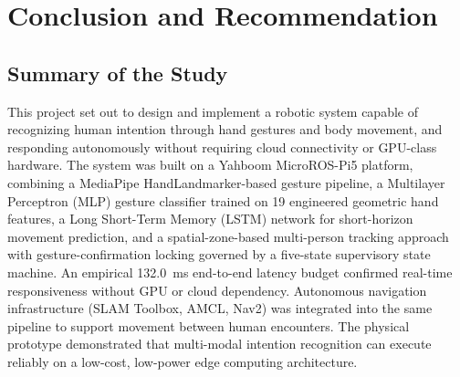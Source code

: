 \chapter{Conclusion and Recommendation}

\section{Summary of the Study}
This project set out to design and implement a robotic system capable of recognizing human intention through hand gestures and body movement, and responding autonomously without requiring cloud connectivity or GPU-class hardware. The system was built on a Yahboom MicroROS-Pi5 platform, combining a MediaPipe HandLandmarker-based gesture pipeline, a Multilayer Perceptron (MLP) gesture classifier trained on 19 engineered geometric hand features, a Long Short-Term Memory (LSTM) network for short-horizon movement prediction, and a spatial-zone-based multi-person tracking approach with gesture-confirmation locking governed by a five-state supervisory state machine. An empirical 132.0~ms end-to-end latency budget confirmed real-time responsiveness without GPU or cloud dependency. Autonomous navigation infrastructure (SLAM Toolbox, AMCL, Nav2) was integrated into the same pipeline to support movement between human encounters. The physical prototype demonstrated that multi-modal intention recognition can execute reliably on a low-cost, low-power edge computing architecture.

